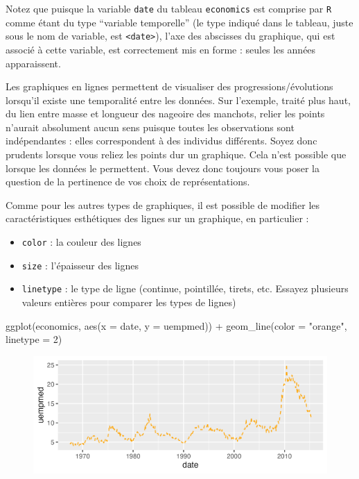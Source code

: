 \documentclass[
  letterpaper,
  DIV=11,
  numbers=noendperiod]{scrreprt}
\newenvironment{Shaded}{\begin{snugshade}}{\end{snugshade}}
\newcommand{\AttributeTok}[1]{\textcolor[rgb]{0.40,0.45,0.13}{#1}}
\newcommand{\DecValTok}[1]{\textcolor[rgb]{0.68,0.00,0.00}{#1}}
\newcommand{\FunctionTok}[1]{\textcolor[rgb]{0.28,0.35,0.67}{#1}}
\newcommand{\NormalTok}[1]{\textcolor[rgb]{0.00,0.23,0.31}{#1}}
\newcommand{\SpecialCharTok}[1]{\textcolor[rgb]{0.37,0.37,0.37}{#1}}
\newcommand{\StringTok}[1]{\textcolor[rgb]{0.13,0.47,0.30}{#1}}
\providecommand{\tightlist}{%
  \setlength{\itemsep}{0pt}\setlength{\parskip}{0pt}}\usepackage{longtable,booktabs,array}
\begin{document}
Notez que puisque la variable \texttt{date} du tableau
\texttt{economics} est comprise par \texttt{R} comme étant du type
``variable temporelle'' (le type indiqué dans le tableau, juste sous le
nom de variable, est \texttt{\textless{}date\textgreater{}}), l'axe des
abscisses du graphique, qui est associé à cette variable, est
correctement mis en forme : seules les années apparaissent.

Les graphiques en lignes permettent de visualiser des
progressions/évolutions lorsqu'il existe une temporalité entre les
données. Sur l'exemple, traité plus haut, du lien entre masse et
longueur des nageoire des manchots, relier les points n'aurait
absolument aucun sens puisque toutes les observations sont indépendantes
: elles correspondent à des individus différents. Soyez donc prudents
lorsque vous reliez les points dur un graphique. Cela n'est possible que
lorsque les données le permettent. Vous devez donc toujours vous poser
la question de la pertinence de vos choix de représentations.

Comme pour les autres types de graphiques, il est possible de modifier
les caractéristiques esthétiques des lignes sur un graphique, en
particulier :

\begin{itemize}
\tightlist
\item
  \texttt{color} : la couleur des lignes
\item
  \texttt{size} : l'épaisseur des lignes
\item
  \texttt{linetype} : le type de ligne (continue, pointillée, tirets,
  etc. Essayez plusieurs valeurs entières pour comparer les types de
  lignes)
\end{itemize}

\begin{Shaded}
\begin{Highlighting}[]
\FunctionTok{ggplot}\NormalTok{(economics, }\FunctionTok{aes}\NormalTok{(}\AttributeTok{x =}\NormalTok{ date, }\AttributeTok{y =}\NormalTok{ uempmed)) }\SpecialCharTok{+}
  \FunctionTok{geom\_line}\NormalTok{(}\AttributeTok{color =} \StringTok{"orange"}\NormalTok{, }\AttributeTok{linetype =} \DecValTok{2}\NormalTok{)}
\end{Highlighting}
\end{Shaded}

\begin{figure}[H]

{\centering \includegraphics{./03-visualization_files/figure-pdf/unnamed-chunk-52-1.png}

}

\end{figure}
\end{document}
